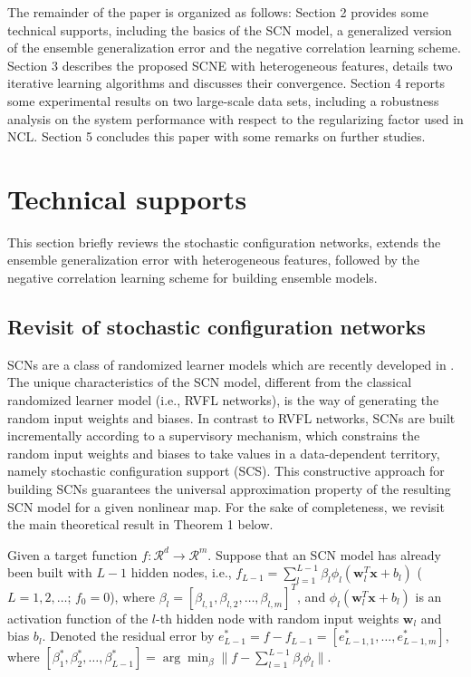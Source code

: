 \documentclass{article}
\begin{document}
The remainder of the paper is organized as follows: 
Section 2 provides  some technical supports, including the basics of the SCN model, a generalized version of the ensemble generalization error and the negative correlation learning scheme. 
Section 3 describes the proposed SCNE with heterogeneous features, details two iterative learning algorithms and discusses their convergence. 
Section 4 reports some experimental results on two large-scale data sets, including a robustness analysis on the system performance with respect to the regularizing factor used in NCL. 
Section 5 concludes this paper with some remarks on further studies. 

\section{Technical supports}
This section briefly reviews the stochastic configuration networks, extends the ensemble generalization error with heterogeneous features, followed by the negative correlation learning scheme for building ensemble models. 
\subsection{Revisit of stochastic configuration networks}
SCNs are a class of randomized learner models which are recently developed in \cite{WangandLi_SCN}.  
The unique characteristics of the SCN model, different from the classical randomized learner model (i.e., RVFL networks), is the way of generating the random input weights and biases.  
In contrast to RVFL networks, SCNs are built incrementally according to a supervisory mechanism, which constrains the random input weights and biases to take values in a data-dependent territory, namely stochastic configuration support (SCS). 
This constructive approach for building SCNs guarantees the universal approximation property of the resulting SCN model for a given nonlinear map. 
For the sake of completeness, we revisit the main theoretical result in Theorem 1 below. 
 
Given a target function $f: \mathcal{R}^d \rightarrow \mathcal{R}^m$.
Suppose that an SCN model has already been built with $L-1$ hidden nodes, i.e., $f_{L-1} =  \sum_{l=1}^{L-1}\beta_{l}\phi_l(\bm{w}_l^T\bm{x} + b_l)$  ($L=1,2,\dots$; $f_0 = 0$), where $\beta_{l} = [\beta_{l,1}, \beta_{l,2}, \dots, \beta_{l,m}]^T$, and $\phi_l(\bm{w}_l^T\bm{x} + b_l)$ is an activation function of the $l$-th hidden node with random input weights $\bm{w}_l$ and bias $b_l$.
Denoted the residual error by $e_{L-1}^* = f - f_{L-1} = [e_{L-1,1}^*, \dots, e_{L-1,m}^*]$,  where $[\beta_1^{*}, \beta_2^{*},\ldots,\beta_{L-1}^{*}]=\arg \min_{\beta}\|f-\sum_{l=1}^{L-1}\beta_l \phi_l\|$.
\end{document}
